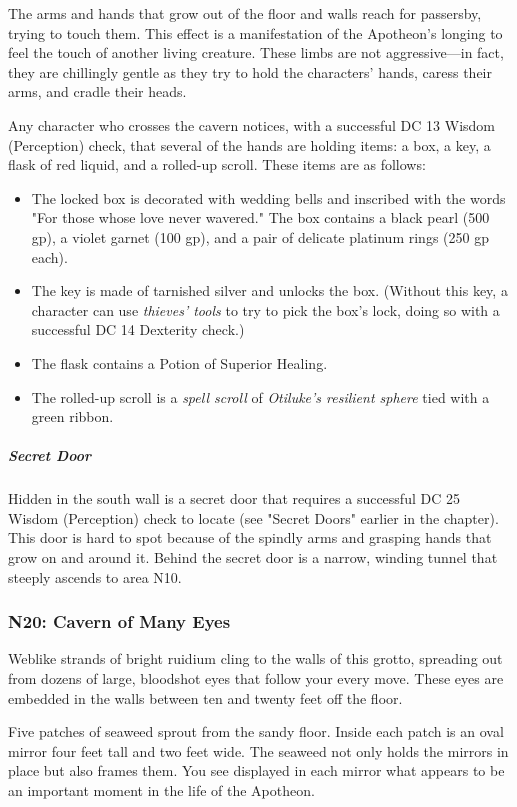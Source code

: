 \documentclass[10pt,a4paper,twoside,bg=print,twocolumn,openany,nodeprecatedcode]{dndbook}
\begin{document}
The arms and hands that grow out of the floor and walls reach for passersby, trying to touch them. This effect is a manifestation of the Apotheon's longing to feel the touch of another living creature. These limbs are not aggressive—in fact, they are chillingly gentle as they try to hold the characters' hands, caress their arms, and cradle their heads.

Any character who crosses the cavern notices, with a successful DC 13 Wisdom (Perception) check, that several of the hands are holding items: a box, a key, a flask of red liquid, and a rolled-up scroll. These items are as follows:


\begin{itemize}
\item The locked box is decorated with wedding bells and inscribed with the words "For those whose love never wavered." The box contains a black pearl (500 gp), a violet garnet (100 gp), and a pair of delicate platinum rings (250 gp each).
\item The key is made of tarnished silver and unlocks the box. (Without this key, a character can use \textit{thieves' tools} to try to pick the box's lock, doing so with a successful DC 14 Dexterity check.)
\item The flask contains a Potion of Superior Healing.
\item The rolled-up scroll is a \textit{spell scroll} of \textit{Otiluke's resilient sphere} tied with a green ribbon.
\end{itemize}

\subparagraph{Secret Door}
Hidden in the south wall is a secret door that requires a successful DC 25 Wisdom (Perception) check to locate (see "Secret Doors" earlier in the chapter). This door is hard to spot because of the spindly arms and grasping hands that grow on and around it. Behind the secret door is a narrow, winding tunnel that steeply ascends to area N10.

\subsubsection{N20: Cavern of Many Eyes}
\begin{DndReadAloud}{}
Weblike strands of bright ruidium cling to the walls of this grotto, spreading out from dozens of large, bloodshot eyes that follow your every move. These eyes are embedded in the walls between ten and twenty feet off the floor.

Five patches of seaweed sprout from the sandy floor. Inside each patch is an oval mirror four feet tall and two feet wide. The seaweed not only holds the mirrors in place but also frames them. You see displayed in each mirror what appears to be an important moment in the life of the Apotheon.

\end{DndReadAloud}
\end{document}
